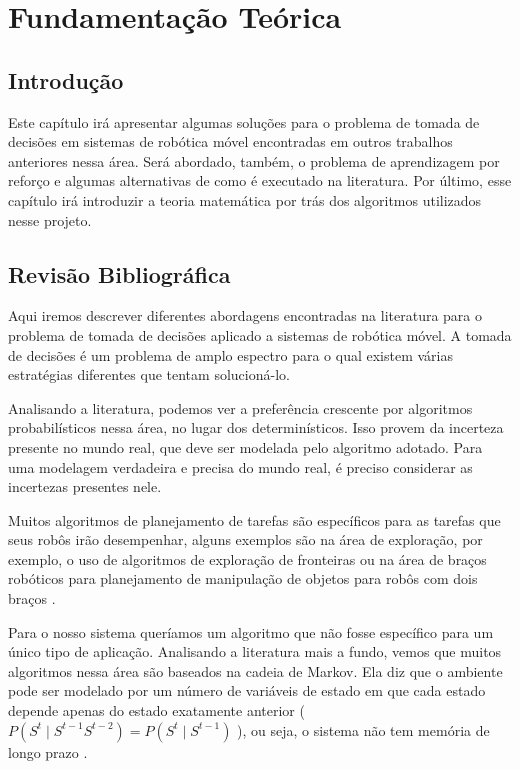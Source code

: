 
\chapter{Fundamentação Teórica} \label{chap:FundamentacaoMatematica}



\section{Introdução}

Este capítulo irá apresentar algumas soluções para o problema de tomada de decisões em sistemas de robótica móvel encontradas em outros trabalhos anteriores nessa área. Será abordado, também, o problema de aprendizagem por reforço e algumas alternativas de como é executado na literatura. Por último, esse capítulo irá introduzir a teoria matemática por trás dos algoritmos utilizados nesse projeto.


\section{Revisão Bibliográfica} \label{section:RevisaoBibliografica}

Aqui iremos descrever diferentes abordagens encontradas na literatura para o problema de tomada de decisões aplicado a sistemas de robótica móvel. A tomada de decisões é um problema de amplo espectro para o qual existem várias estratégias diferentes que tentam solucioná-lo.

Analisando a literatura, podemos ver a preferência crescente por algoritmos probabilísticos nessa área, no lugar dos determinísticos. Isso provem da incerteza presente no mundo real, que deve ser modelada pelo algoritmo adotado. Para uma modelagem verdadeira e precisa do mundo real, é preciso considerar as incertezas presentes nele.

Muitos algoritmos de planejamento de tarefas são específicos para as tarefas que seus robôs irão desempenhar, alguns exemplos são na área de exploração, por exemplo, o uso de algoritmos de exploração de fronteiras \cite{conf:icra:FredaO05,Yamauchi:1998:FEU,Yamauchi:1997:FAA} ou na área de braços robóticos para planejamento de manipulação de objetos para robôs com dois braços \cite{Berenson_2009_6465}.

Para o nosso sistema queríamos um algoritmo que não fosse específico para um único tipo de aplicação. Analisando a literatura mais a fundo, vemos que muitos algoritmos nessa área são baseados na cadeia de Markov. Ela diz que o ambiente pode ser modelado por um número de variáveis de estado em que cada estado depende apenas do estado exatamente anterior ( $ P(S^t\mid S^{t-1}S^{t-2})=P(S^t\mid S^{t-1}) $ ), ou seja, o sistema não tem memória de longo prazo \cite{books:daglib:0095301}.

